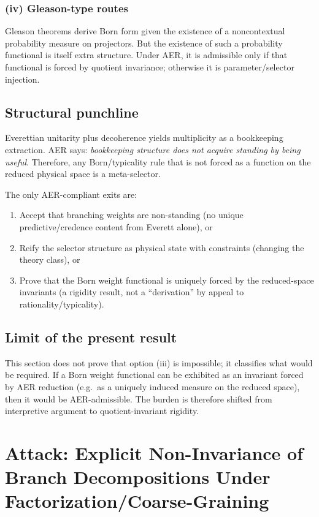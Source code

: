 \documentclass[11pt]{article}
\theoremstyle{remark}
\theoremstyle{plain}
\begin{document}
\subsubsection*{(iv) Gleason-type routes}
Gleason theorems derive Born form given the existence of a noncontextual probability measure on projectors.
But the existence of such a probability functional is itself extra structure.
Under AER, it is admissible only if that functional is forced by quotient invariance; otherwise it is parameter/selector injection.

\subsection{Structural punchline}

Everettian unitarity plus decoherence yields multiplicity as a bookkeeping extraction.
AER says: \emph{bookkeeping structure does not acquire standing by being useful}.
Therefore, any Born/typicality rule that is not forced as a function on the reduced physical space is a meta-selector.

The only AER-compliant exits are:
\begin{enumerate}
\item Accept that branching weights are non-standing (no unique predictive/credence content from Everett alone), or
\item Reify the selector structure as physical state with constraints (changing the theory class), or
\item Prove that the Born weight functional is uniquely forced by the reduced-space invariants (a rigidity result, not a ``derivation'' by appeal to rationality/typicality).
\end{enumerate}

\subsection{Limit of the present result}

This section does not prove that option (iii) is impossible; it classifies what would be required.
If a Born weight functional can be exhibited as an invariant forced by AER reduction (e.g.\ as a uniquely induced measure on the reduced space),
then it would be AER-admissible. The burden is therefore shifted from interpretive argument to quotient-invariant rigidity.



\section{Attack: Explicit Non-Invariance of Branch Decompositions Under Factorization/Coarse-Graining}
\label{sec:everett-attack}
\end{document}
